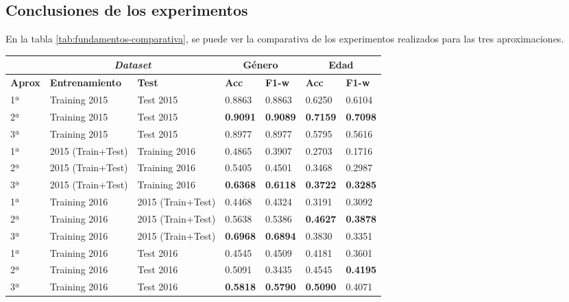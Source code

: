 \subsection{Conclusiones de los experimentos}
En la tabla \ref{tab:fundamentos-comparativa}, se puede ver la comparativa de los experimentos realizados para las tres aproximaciones.  
\begin{table}[H]
    \centering
    {
    \setlength{\tabcolsep}{0.3\tabcolsep}
        \begin{tabular}{|l|l|l|ll|ll|}
            \hhline{~------}
            \rowcolor{udcpink!25}
            \multicolumn{1}{c}{\cellcolor{white}} & \multicolumn{2}{|c|}{\textbf{\textit{Dataset}}} & \multicolumn{2}{c|}{\textbf{Género}} & \multicolumn{2}{c|}{\textbf{Edad}} \\ \hline
            \textbf{Aprox} & \textbf{Entrenamiento} & \textbf{Test} & \textbf{Acc} & \textbf{F1-w} & \textbf{Acc} & \textbf{F1-w}\\ \hline
            1ª & Training 2015     & Test 2015         & 0.8863   & 0.8863 & 0.6250   & 0.6104\\
            2ª & Training 2015 & Test 2015 & \textbf{0.9091} & \textbf{0.9089} & \textbf{0.7159} & \textbf{0.7098} \\ 
            3ª & Training 2015 & Test 2015 & 0.8977 & 0.8977 & 0.5795 & 0.5616 \\ %
            \hline
            
            1ª & 2015 (Train+Test) & Training 2016     & 0.4865 & 0.3907 & 0.2703     & 0.1716\\
            2ª & 2015 (Train+Test) & Training 2016 & 0.5405 & 0.4501 & 0.3468 & 0.2987 \\
            3ª & 2015 (Train+Test) & Training 2016 & \textbf{0.6368} & \textbf{0.6118} & \textbf{0.3722} & \textbf{0.3285}\\ %
            \hline
            
            1ª & Training 2016     & 2015 (Train+Test) & 0.4468   & 0.4324 & 0.3191   & 0.3092\\
            2ª & Training 2016 & 2015 (Train+Test) & 0.5638 & 0.5386 & \textbf{0.4627}  & \textbf{0.3878} \\
            3ª & Training 2016 & 2015 (Train+Test) & \textbf{0.6968} & \textbf{0.6894} & 0.3830 & 0.3351 \\ %
            \hline
            
            1ª & Training 2016     & Test 2016         & 0.4545   & 0.4509 & 0.4181   & 0.3601\\ 
            2ª & Training 2016 & Test 2016 & 0.5091 & 0.3435 & 0.4545  &  \textbf{0.4195} \\ 
            3ª & Training 2016 & Test 2016 & \textbf{0.5818} & \textbf{0.5790} & \textbf{0.5090} & 0.4071 \\ %
            \hline
            

\end{tabular}}
\end{table}

